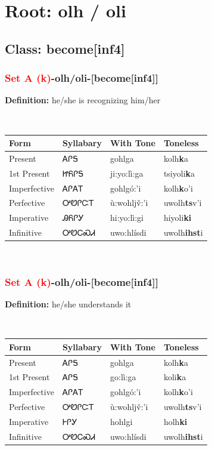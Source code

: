 \needspace{4in}
\section*{Root: olh / oli}
\nopagebreak
{}
\needspace{3in}
\subsection*{Class: become[inf4]}
\nopagebreak
\needspace{2in}
\subsubsection*{\textcolor{Red}{Set A (k)}{-}\textbf{olh/oli}{-}[become[inf4]]}
\nopagebreak
\textbf{Definition: } he/she is recognizing him/her
\\[0.5em]
\begin{tabularx}{\textwidth}{l X X X}%
\toprule%
\textbf{Form}&\textbf{Syllabary}&\textbf{With Tone}&\textbf{Toneless}\\%
\midrule%
Present&ᎪᎵᎦ&gohlga&kolh\textbf{k}a\\%
1st Present&ᏥᏲᎵᎦ&ji:yo:lì:ga&tsiyoli\textbf{k}a\\%
Imperfective&ᎪᎵᎪᎢ&gohlgó:’i&kolh\textbf{k}o'i\\%
Perfective&ᎤᏬᎵᏨᎢ&ù:wohljv̌:’i&uwolh\textbf{ts}v'i\\%
Imperative&ᎯᏲᎵᎩ&hi:yo:lì:gi&hiyoli\textbf{ki}\\%
Infinitive&ᎤᏬᏟᏍᏗ&uwo:hlísdi&uwolh\textbf{ihst}i\\%
\bottomrule%
\end{tabularx}
\\[1em]
\needspace{2in}
\subsubsection*{\textcolor{Red}{Set A (k)}{-}\textbf{olh/oli}{-}[become[inf4]]}
\nopagebreak
\textbf{Definition: } he/she understands it
\\[0.5em]
\begin{tabularx}{\textwidth}{l X X X}%
\toprule%
\textbf{Form}&\textbf{Syllabary}&\textbf{With Tone}&\textbf{Toneless}\\%
\midrule%
Present&ᎪᎵᎦ&gohlga&kolh\textbf{k}a\\%
1st Present&ᎪᎵᎦ&go:lì:ga&koli\textbf{k}a\\%
Imperfective&ᎪᎵᎪᎢ&gohlgó:’i&kolh\textbf{k}o'i\\%
Perfective&ᎤᏬᎵᏨᎢ&ù:wohljv̌:’i&uwolh\textbf{ts}v'i\\%
Imperative&ᎰᎵᎩ&hohlgi&holh\textbf{ki}\\%
Infinitive&ᎤᏬᏟᏍᏗ&uwo:hlísdi&uwolh\textbf{ihst}i\\%
\bottomrule%
\end{tabularx}
\\[1em]